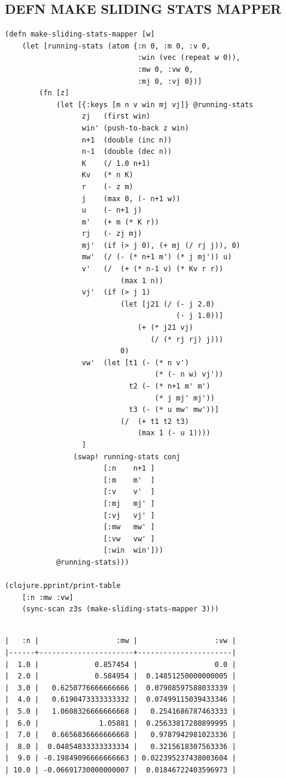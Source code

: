 \documentclass[10pt,oneside,x11names]{article}
\begin{document}
\subsection{DEFN MAKE SLIDING STATS MAPPER}
\label{sec:org7de7b8a}

\begin{verbatim}
(defn make-sliding-stats-mapper [w]
    (let [running-stats (atom {:n 0, :m 0, :v 0,
                               :win (vec (repeat w 0)),
                               :mw 0, :vw 0,
                               :mj 0, :vj 0})]
        (fn [z]
            (let [{:keys [m n v win mj vj]} @running-stats
                  zj   (first win)
                  win' (push-to-back z win)
                  n+1  (double (inc n))
                  n-1  (double (dec n))
                  K    (/ 1.0 n+1)
                  Kv   (* n K)
                  r    (- z m)
                  j    (max 0, (- n+1 w))
                  u    (- n+1 j)
                  m'   (+ m (* K r))
                  rj   (- zj mj)
                  mj'  (if (> j 0), (+ mj (/ rj j)), 0)
                  mw'  (/ (- (* n+1 m') (* j mj')) u)
                  v'   (/  (+ (* n-1 v) (* Kv r r))
                           (max 1 n))
                  vj'  (if (> j 1)
                           (let [j21 (/ (- j 2.0)
                                        (- j 1.0))]
                               (+ (* j21 vj)
                                  (/ (* rj rj) j)))
                           0)
                  vw'  (let [t1 (- (* n v')
                                   (* (- n w) vj'))
                             t2 (- (* n+1 m' m')
                                   (* j mj' mj'))
                             t3 (- (* u mw' mw'))]
                           (/  (+ t1 t2 t3)
                               (max 1 (- u 1))))
                  ]
                (swap! running-stats conj
                       [:n    n+1 ]
                       [:m    m'  ]
                       [:v    v'  ]
                       [:mj   mj' ]
                       [:vj   vj' ]
                       [:mw   mw' ]
                       [:vw   vw' ]
                       [:win  win']))
            @running-stats)))

(clojure.pprint/print-table
    [:n :mw :vw]
    (sync-scan z3s (make-sliding-stats-mapper 3)))
\end{verbatim}

\begin{verbatim}

|   :n |                  :mw |                  :vw |
|------+----------------------+----------------------|
|  1.0 |             0.857454 |                  0.0 |
|  2.0 |             0.584954 |  0.14851250000000005 |
|  3.0 |   0.6250776666666666 |  0.07908597588033339 |
|  4.0 |   0.6190473333333332 |  0.07499115039433346 |
|  5.0 |   1.0608326666666668 |   0.2541686787463333 |
|  6.0 |              1.05881 |  0.25633817280899995 |
|  7.0 |   0.6656836666666668 |   0.9787942981023336 |
|  8.0 |  0.04854833333333334 |   0.3215618307563336 |
|  9.0 | -0.19849096666666663 | 0.022395237438003604 |
| 10.0 | -0.06691730000000007 |  0.01846722403596973 |
\end{verbatim}
\end{document}
